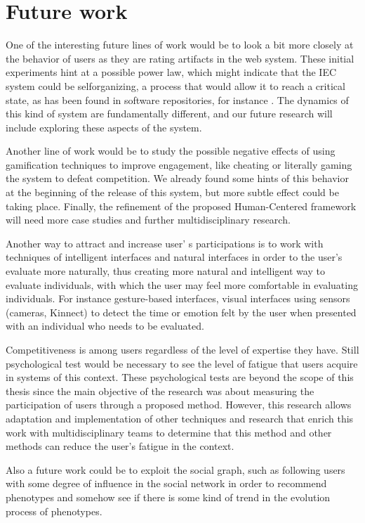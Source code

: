 \section{Future work}

One of the interesting future lines of work would be to look a bit more closely at the
behavior of users as they are rating artifacts in the web system. These initial
experiments hint at a possible power law, which might indicate that the IEC
system could be selforganizing, a process that would allow it to reach a
critical state, as has been found in software repositories, for instance \cite{merelo2016self}.
The dynamics of this kind of system are fundamentally different, and our future
research will include exploring these aspects of the system.

Another line of work would be to study the possible negative effects of using gamification
techniques to improve engagement, like cheating or literally gaming the system
to defeat competition. We already found some hints of this behavior at the
beginning of the release of this system, but more subtle effect could be taking
place. Finally, the refinement of the proposed Human-Centered framework will
need more case studies and further multidisciplinary research.

Another way to attract and increase user' s participations is to work with
techniques of intelligent interfaces and natural interfaces in order to the
user's evaluate more naturally, thus creating more natural and intelligent way
to evaluate individuals, with which the user may feel more comfortable in
evaluating individuals. For instance  gesture-based interfaces, visual
interfaces using sensors (cameras, Kinnect) to detect the time or emotion felt
by the user when presented with an individual who needs to be evaluated.

Competitiveness is among users regardless of the level of expertise they have.
Still psychological test would be necessary to see the level of fatigue that
users acquire in systems of this context. These psychological tests are beyond
the scope of this thesis since the main objective of the research was about
measuring the participation of users through a proposed method. However, this
research allows adaptation and implementation of other techniques and research
that enrich this work with multidisciplinary teams to determine that this method
and other methods can reduce the user's fatigue in the context.


Also a future work could be to exploit the social graph, such as following users
with some degree of influence in the social network in order to recommend
phenotypes and somehow see if there is some kind of trend in the evolution
process of phenotypes.
